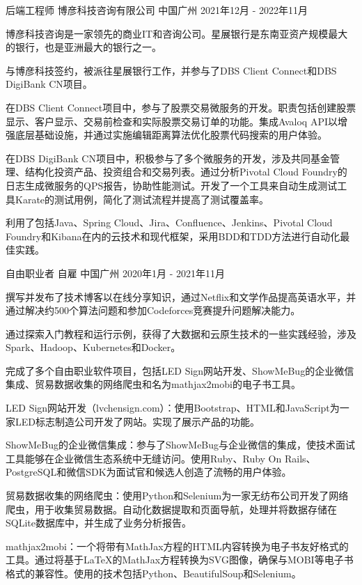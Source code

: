 \begin{cventries}
  \cventry
    {后端工程师} %
    {博彦科技咨询有限公司} %
    {中国广州} %
    {2021年12月 - 2022年11月} %
    {
      \begin{cvitems} %
        \item {博彦科技咨询是一家领先的商业IT和咨询公司。星展银行是东南亚资产规模最大的银行，也是亚洲最大的银行之一。}
        \item {与博彦科技签约，被派往星展银行工作，并参与了DBS Client Connect和DBS DigiBank CN项目。}
        \item {在DBS Client Connect项目中，参与了股票交易微服务的开发。职责包括创建股票显示、客户显示、交易前检查和实际股票交易订单的功能。集成Avaloq API以增强底层基础设施，并通过实施编辑距离算法优化股票代码搜索的用户体验。}
        \item {在DBS DigiBank CN项目中，积极参与了多个微服务的开发，涉及共同基金管理、结构化投资产品、投资组合和交易列表。通过分析Pivotal Cloud Foundry的日志生成微服务的QPS报告，协助性能测试。开发了一个工具来自动生成测试工具Karate的测试用例，简化了测试流程并提高了测试覆盖率。}
        \item {利用了包括Java、Spring Cloud、Jira、Confluence、Jenkins、Pivotal Cloud Foundry和Kibana在内的云技术和现代框架，采用BDD和TDD方法进行自动化最佳实践。}
      \end{cvitems}
    }

\cventry
{自由职业者} %
{自雇} %
{中国广州} %
{2020年1月 - 2021年11月} %
{
  \begin{cvitems} %
    \item {撰写并发布了技术博客以在线分享知识，通过Netflix和文学作品提高英语水平，并通过解决约500个算法问题和参加Codeforces竞赛提升问题解决能力。}
    \item {通过探索入门教程和运行示例，获得了大数据和云原生技术的一些实践经验，涉及Spark、Hadoop、Kubernetes和Docker。}
    \item {完成了多个自由职业软件项目，包括LED Sign网站开发、ShowMeBug的企业微信集成、贸易数据收集的网络爬虫和名为mathjax2mobi的电子书工具。}
    \item {LED Sign网站开发（lvchensign.com）：使用Bootstrap、HTML和JavaScript为一家LED标志制造公司开发了网站。实现了展示产品的功能。}
    \item {ShowMeBug的企业微信集成：参与了ShowMeBug与企业微信的集成，使技术面试工具能够在企业微信生态系统中无缝访问。使用Ruby、Ruby On Rails、PostgreSQL和微信SDK为面试官和候选人创造了流畅的用户体验。}
    \item {贸易数据收集的网络爬虫：使用Python和Selenium为一家无纺布公司开发了网络爬虫，用于收集贸易数据。自动化数据提取和页面导航，处理并将数据存储在SQLite数据库中，并生成了业务分析报告。}
    \item {mathjax2mobi：一个将带有MathJax方程的HTML内容转换为电子书友好格式的工具。通过将基于LaTeX的MathJax方程转换为SVG图像，确保与MOBI等电子书格式的兼容性。使用的技术包括Python、BeautifulSoup和Selenium。}
  \end{cvitems}
}


\end{cventries}
